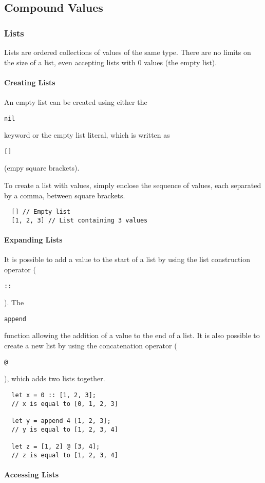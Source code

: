 \documentclass{article}
\def\code#1{\begin{footnotesize}\texttt{#1}\end{footnotesize}}
\begin{document}
\subsection{Compound Values}

\subsubsection{Lists}

Lists are ordered collections of values of the same type.
There are no limits on the size of a list, even accepting lists with 0 values (the empty list).

\paragraph{Creating Lists}

An empty list can be created using either the \code{nil} keyword or the empty list literal, which is written as \code{[]} (empy square brackets).

To create a list with values, simply enclose the sequence of values, each separated by a comma, between square brackets.

\begin{lstlisting}
  [] // Empty list
  [1, 2, 3] // List containing 3 values
\end{lstlisting}

\paragraph{Expanding Lists}

It is possible to add a value to the start of a list by using the list construction operator (\code{::}).
The \code{append} function allowing the addition of a value to the end of a list.
It is also possible to create a new list by using the concatenation operator (\code{@}), which adds two lists together.

\begin{lstlisting}
  let x = 0 :: [1, 2, 3];
  // x is equal to [0, 1, 2, 3]

  let y = append 4 [1, 2, 3];
  // y is equal to [1, 2, 3, 4]

  let z = [1, 2] @ [3, 4];
  // z is equal to [1, 2, 3, 4]
\end{lstlisting}

\paragraph{Accessing Lists}
\end{document}
